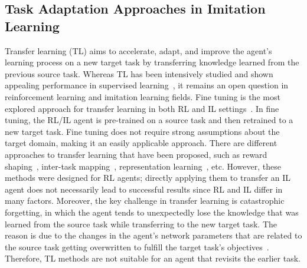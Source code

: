 \subsection{Task Adaptation Approaches in Imitation Learning}

Transfer learning (TL) aims to accelerate,
adapt,
and improve the agent's learning process on a new target task by transferring knowledge learned from the previous source task.
Whereas TL has been intensively studied and shown appealing performance in supervised learning~\cite{TL_SL_1, TL_SL_2, TL_SL_3, TL_SL_4, TL_SL_5, TL_SL_6, TL_SL_7},
it remains an open question in reinforcement learning and imitation learning fields.
Fine tuning is the most explored approach for transfer learning in both RL and IL settings~\cite{TL_FineTuning_1, TL_FineTuning_2, TL_FineTuning_3}.
In fine tuning,
the RL/IL agent is pre-trained on a source task and then retrained to a new target task.
Fine tuning does not require strong assumptions about the target domain,
making it an easily applicable approach.
There are different approaches to transfer learning that have been proposed, such as reward shaping~\cite{TL_RewardShaping_1, TL_RewardShaping_2, TL_RewardShaping_3},
inter-task mapping~\cite{TL_InterTask_1, TL_InterTask_2, TL_InterTask_3},
representation learning~\cite{TL_Representation_1, TL_Representation_2, TL_Representation_3},
etc.
However,
these methods were designed for RL agents;
directly applying them to transfer an IL agent does not necessarily lead to successful results since RL and IL differ in many factors.
Moreover,
the key challenge in transfer learning is catastrophic forgetting,
in which the agent tends to unexpectedly lose the knowledge that was learned from the source task while transferring to the new target task.
The reason is due to the changes in the agent's network parameters that are related to the source task getting overwritten to fulfill the target task's objectives~\cite{TL_Forgetting_1}.
Therefore,
TL methods are not suitable for an agent that revisits the earlier task.
